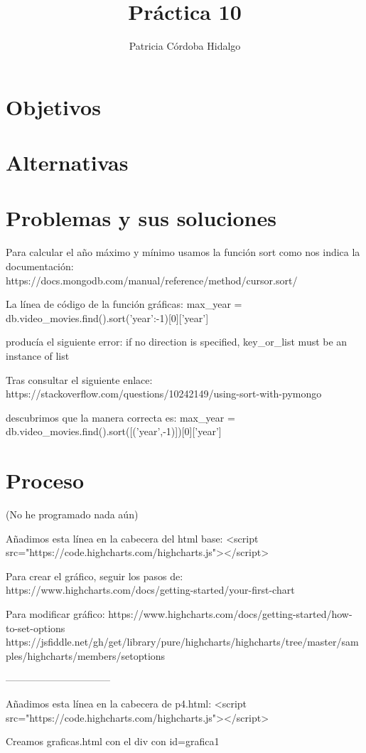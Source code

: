 \documentclass{article}
\begin{document}
\title{Práctica 10}
\author{Patricia Córdoba Hidalgo}
\date{}
\maketitle

\section{Objetivos}

\section{Alternativas}

\section{Problemas y sus soluciones}

Para calcular el año máximo y mínimo usamos la función sort como nos indica la documentación:
https://docs.mongodb.com/manual/reference/method/cursor.sort/

La línea de código de la función gráficas:
max_year = db.video_movies.find().sort({'year':-1})[0]['year']

producía el siguiente error:
if no direction is specified, key_or_list must be an instance of list

Tras consultar el siguiente enlace:
https://stackoverflow.com/questions/10242149/using-sort-with-pymongo

descubrimos que la manera correcta es:
max_year = db.video_movies.find().sort([('year',-1)])[0]['year']

\section{Proceso}

(No he programado nada aún)

Añadimos esta línea en la cabecera del html base:
<script src="https://code.highcharts.com/highcharts.js"></script>

Para crear el gráfico, seguir los pasos de:
https://www.highcharts.com/docs/getting-started/your-first-chart

Para modificar gráfico:
https://www.highcharts.com/docs/getting-started/how-to-set-options
https://jsfiddle.net/gh/get/library/pure/highcharts/highcharts/tree/master/samples/highcharts/members/setoptions

--------------------------------

Añadimos esta línea en la cabecera de p4.html:
<script src="https://code.highcharts.com/highcharts.js"></script>

Creamos graficas.html con el div con id=grafica1
\end{document}
